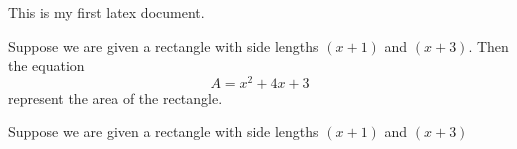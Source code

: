 \documentclass[10pt]{article}
\begin{document}
This is my first latex document.

Suppose we are given a rectangle with side lengths $(x+1)$ and $(x+3)$. Then the equation $$A=x^2+4x+3$$ represent the area of the rectangle.

Suppose we are given a rectangle with side lengths $(x+1)$ and $(x+3)$ 
\end{document}
